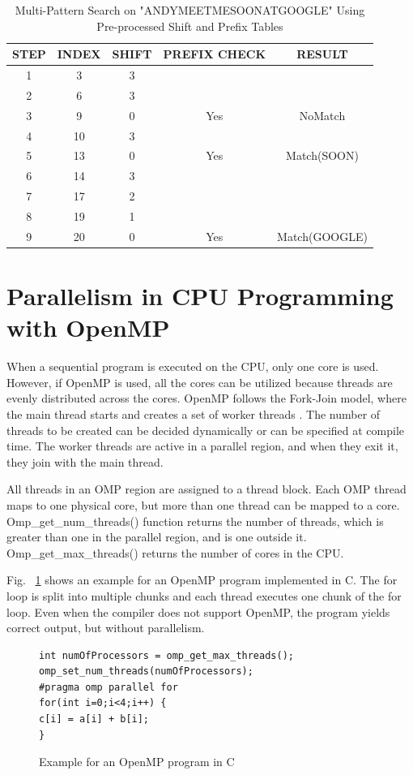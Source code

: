 \begin {table}[H]
\centering
\caption {Multi-Pattern Search on "ANDYMEETMESOONATGOOGLE" Using Pre-processed Shift and Prefix Tables} \label{tab:searchwuman}
\begin{tabular}{|c|c|c|c|c|}
\midrule
STEP & INDEX & SHIFT & PREFIX CHECK & RESULT\\
\midrule
1 & 3 & 3 & &\\
\midrule
2 & 6 & 3 & &\\
\midrule
3 & 9 & 0 & Yes & NoMatch\\
\midrule
4 & 10 & 3 & &\\
\midrule
5 & 13 & 0 & Yes & Match(SOON)\\
\midrule
6 & 14 & 3 & &\\
\midrule
7 & 17 & 2 & &\\
\midrule
8 & 19 & 1 & &\\
\midrule
9 & 20 & 0 & Yes & Match(GOOGLE)\\
\midrule
\end{tabular}
\end{table}
\squeezeup



\section{Parallelism in CPU Programming with OpenMP}
When a sequential program is executed on the CPU, only one core is used. However, if OpenMP is used, all the cores can be utilized because threads are evenly distributed across the cores. OpenMP follows the Fork-Join model, where the main thread starts and creates a set of worker threads \cite{bib31}. The number of threads to be created can be decided dynamically or can be specified at compile time. The worker threads are active in a parallel region, and when they exit it, they join with the main thread.

All threads in an OMP region are assigned to a thread block. Each OMP thread maps to one physical core, but more than one thread can be mapped to a core. 
Omp\_get\_num\_threads() function returns the number of threads, which is greater than one in the parallel region, and is one outside it. Omp\_get\_max\_threads() returns the number of cores in the CPU. 

Fig. ~\ref{fig:openmp} shows an example for an OpenMP program implemented in C. The for loop is split into multiple chunks and each thread executes one chunk of the for loop. Even when the compiler does not support OpenMP, the program yields correct output, but without parallelism.

\begin{figure}[H]
\centering
\begin{lstlisting}
int numOfProcessors = omp_get_max_threads();
omp_set_num_threads(numOfProcessors);
#pragma omp parallel for
for(int i=0;i<4;i++) {
c[i] = a[i] + b[i];
}
\end{lstlisting}
\caption{Example for an OpenMP program in C}
\label{fig:openmp}
\end{figure}
\squeezeup